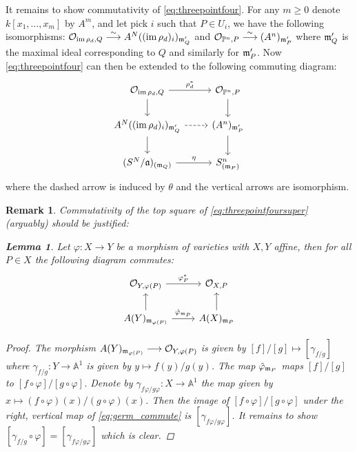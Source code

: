 \documentclass[12pt]{article}
\numberwithin{thm}{subsection}
\numberwithin{defn}{subsection}
\newtheorem{lemma}{Lemma}
\numberwithin{lemma}{subsection}
\numberwithin{example}{subsection}
\numberwithin{notation}{subsection}
\numberwithin{cor}{subsection}
\newtheorem{remark}{Remark}
\numberwithin{remark}{subsection}
\numberwithin{condition}{subsection}
\numberwithin{question}{subsection}
\numberwithin{construction}{subsection}
\numberwithin{construction}{subsection}
\numberwithin{construction}{subsection}
\newcommand{\bb}[1]{\mathbb{#1}}
\newcommand{\call}[1]{\mathcal{#1}}
\newcommand{\lto}{\longrightarrow}
\newcommand{\im}{\operatorname{im}}
\begin{document}
%
It remains to show commutativity of \eqref{eq:threepointfour}. For any $m \geq 0$ denote $k[x_1,...,x_m]$ by $A^m$, and let pick $i$ such that $P \in U_i$, we have the following isomorphisms: $\call{O}_{\im \rho_d, Q} \stackrel{\sim}{\lto} A^N((\im \rho_d)_i)_{\frak{m}'_{Q}}$ and $\call{O}_{\bb{P}^n,P} \stackrel{\sim}{\lto} (A^n)_{\frak{m}'_P}$ where $\frak{m}'_Q$ is the maximal ideal corresponding to $Q$ and similarly for $\frak{m}'_P$. Now \eqref{eq:threepointfour} can then be extended to the following commuting diagram:
\begin{equation}
\label{eq:threepointfoursuper}
\begin{tikzcd}
\call{O}_{\im \rho_d, Q}\arrow[r,"{\rho_d^\ast}"]\arrow[d] & \call{O}_{\bb{P}^n,P}\arrow[d]\\
A^N((\im \rho_d)_i)_{\frak{m}'_{Q}}\arrow[r,dashed]\arrow[d] & (A^n)_{\frak{m}'_P}\arrow[d]\\
(S^N/\frak{a})_{(\frak{m}_{Q})}\arrow[r,"{\eta}"] & S^n_{(\frak{m}_P)}
\end{tikzcd}
\end{equation}
where the dashed arrow is induced by $\theta$ and the vertical arrows are isomorphism.
\begin{remark}
Commutativity of the top square of \eqref{eq:threepointfoursuper} (arguably) should be justified:
\begin{lemma}
Let $ \varphi : X\lto Y$ be a morphism of varieties with $X,Y$ affine, then for all $P \in X$ the following diagram commutes:
\begin{equation}
\label{eq:germ_commute}
\begin{tikzcd}
\call{O}_{Y,\varphi(P)}\arrow[r,"{\varphi^\ast_P}"] & \call{O}_{X,P}\\
 A(Y)_{\frak{m}_{\varphi(P)}}\arrow[r,"{\hat{\varphi}_{\frak{m}_P}}"]\arrow[u] & A(X)_{\frak{m}_P}\arrow[u]
 \end{tikzcd}
\end{equation}
\end{lemma}
\begin{proof}
The morphism $A(Y)_{\frak{m}_{\varphi(P)}} \lto \call{O}_{Y,\varphi(P)}$ is given by $[f]/[g] \mapsto [\gamma_{f/g}]$ where $\gamma_{f/g}: Y \lto \bb{A}^1$ is given by $y \mapsto f(y)/g(y)$. The map $\hat{\varphi}_{\frak{m}_P}$ maps $[f]/[g]$ to $[f \circ \varphi]/[g \circ \varphi]$. Denote by $\gamma_{f\varphi/g\varphi}: X \lto \bb{A}^1$ the map given by $x \mapsto (f\circ\varphi)(x)/(g\circ\varphi)(x)$. Then  the image of $[f \circ \varphi]/[g \circ \varphi]$ under the right, vertical map of \eqref{eq:germ_commute} is $[\gamma_{f\varphi/g\varphi}]$. It remains to show $[\gamma_{f/g}\circ \varphi] = [\gamma_{f\varphi/g\varphi}]$ which is clear.
\end{proof}
\end{remark}
\end{document}
